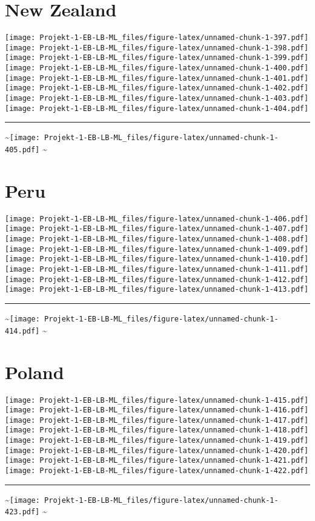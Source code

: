 \documentclass[]{article}
\begin{document}
\section{New Zealand}\label{new-zealand}

\texttt{[image: Projekt-1-EB-LB-ML\_files/figure-latex/unnamed-chunk-1-397.pdf]}
\texttt{[image: Projekt-1-EB-LB-ML\_files/figure-latex/unnamed-chunk-1-398.pdf]}
\texttt{[image: Projekt-1-EB-LB-ML\_files/figure-latex/unnamed-chunk-1-399.pdf]}
\texttt{[image: Projekt-1-EB-LB-ML\_files/figure-latex/unnamed-chunk-1-400.pdf]}
\texttt{[image: Projekt-1-EB-LB-ML\_files/figure-latex/unnamed-chunk-1-401.pdf]}
\texttt{[image: Projekt-1-EB-LB-ML\_files/figure-latex/unnamed-chunk-1-402.pdf]}
\texttt{[image: Projekt-1-EB-LB-ML\_files/figure-latex/unnamed-chunk-1-403.pdf]}
\texttt{[image: Projekt-1-EB-LB-ML\_files/figure-latex/unnamed-chunk-1-404.pdf]}
\bigskip\hrule\bigskip
\textasciitilde{}\hfill\texttt{[image: Projekt-1-EB-LB-ML\_files/figure-latex/unnamed-chunk-1-405.pdf]}
\hfill \textasciitilde{} \vfill\eject

\section{Peru}\label{peru}

\texttt{[image: Projekt-1-EB-LB-ML\_files/figure-latex/unnamed-chunk-1-406.pdf]}
\texttt{[image: Projekt-1-EB-LB-ML\_files/figure-latex/unnamed-chunk-1-407.pdf]}
\texttt{[image: Projekt-1-EB-LB-ML\_files/figure-latex/unnamed-chunk-1-408.pdf]}
\texttt{[image: Projekt-1-EB-LB-ML\_files/figure-latex/unnamed-chunk-1-409.pdf]}
\texttt{[image: Projekt-1-EB-LB-ML\_files/figure-latex/unnamed-chunk-1-410.pdf]}
\texttt{[image: Projekt-1-EB-LB-ML\_files/figure-latex/unnamed-chunk-1-411.pdf]}
\texttt{[image: Projekt-1-EB-LB-ML\_files/figure-latex/unnamed-chunk-1-412.pdf]}
\texttt{[image: Projekt-1-EB-LB-ML\_files/figure-latex/unnamed-chunk-1-413.pdf]}
\bigskip\hrule\bigskip
\textasciitilde{}\hfill\texttt{[image: Projekt-1-EB-LB-ML\_files/figure-latex/unnamed-chunk-1-414.pdf]}
\hfill \textasciitilde{} \vfill\eject

\section{Poland}\label{poland}

\texttt{[image: Projekt-1-EB-LB-ML\_files/figure-latex/unnamed-chunk-1-415.pdf]}
\texttt{[image: Projekt-1-EB-LB-ML\_files/figure-latex/unnamed-chunk-1-416.pdf]}
\texttt{[image: Projekt-1-EB-LB-ML\_files/figure-latex/unnamed-chunk-1-417.pdf]}
\texttt{[image: Projekt-1-EB-LB-ML\_files/figure-latex/unnamed-chunk-1-418.pdf]}
\texttt{[image: Projekt-1-EB-LB-ML\_files/figure-latex/unnamed-chunk-1-419.pdf]}
\texttt{[image: Projekt-1-EB-LB-ML\_files/figure-latex/unnamed-chunk-1-420.pdf]}
\texttt{[image: Projekt-1-EB-LB-ML\_files/figure-latex/unnamed-chunk-1-421.pdf]}
\texttt{[image: Projekt-1-EB-LB-ML\_files/figure-latex/unnamed-chunk-1-422.pdf]}
\bigskip\hrule\bigskip
\textasciitilde{}\hfill\texttt{[image: Projekt-1-EB-LB-ML\_files/figure-latex/unnamed-chunk-1-423.pdf]}
\hfill \textasciitilde{} \vfill\eject
\end{document}
